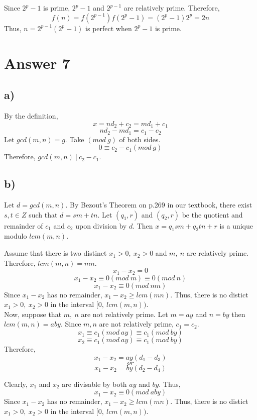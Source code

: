 \documentclass[12pt]{article}
\begin{document}
Since $2^p-1$ is prime, $2^p-1$ and $2^{p-1}$ are relatively prime. Therefore,
$$f(n)=f(2^{p-1})f(2^p-1)=(2^p-1)2^p=2n$$
Thus, $n=2^{p-1}(2^p-1)$ is perfect when $2^p-1$ is prime.

\section*{Answer 7}
\subsection*{a)}
By the definition,
$$x=nd_2+c_2=md_1+c_1$$
$$nd_2-md_1=c_1-c_2$$
Let $gcd(m,n)=g$. Take $(mod\ g)$ of both sides.
$$0 \equiv c_2-c_1(mod\ g)$$
Therefore, $gcd(m,n)\ |\ c_2-c_1$.
\subsection*{b)}
Let $d=gcd(m,n)$. By Bezout's Theorem on p.269 in our textbook, there exist $s,t\in Z$ such that $d=sm+tn$. Let $(q_1,r)$ and $(q_2,r)$ be the quotient and remainder of $c_1$ and $c_2$ upon division by $d$. Then $x=q_1sm+q_2tn+r$ is a unique modulo $lcm(m,n)$.

Assume that there is two distinct $x_1>0,\ x_2>0$ and $m,\ n$ are relatively prime. Therefore, $lcm(m,n)=mn$.
$$x_1-x_2=0$$
$$x_1-x_2\equiv 0(mod\ m)\equiv 0(mod\ n)$$
$$x_1-x_2\equiv 0(mod\ mn)$$
Since $x_1-x_2$ has no remainder, $x_1-x_2\geq lcm(mn)$. Thus, there is no distict $x_1>0,\ x_2>0$ in the interval $[0,\ lcm(m,n))$.\\
Now, suppose that $m,\ n$ are not relatively prime. Let $m=ay$ and $n=by$ then $lcm(m,n)=aby$. Since $m,n$ are not relatively prime, $c_1=c_2$.
$$x_1 \equiv c_1 (mod\ ay)\equiv c_1(mod\ by)$$
$$x_2 \equiv c_1 (mod\ ay)\equiv c_1(mod\ by)$$
Therefore,
$$x_1-x_2= ay(d_1-d_3)$$
$$or$$
$$x_1-x_2= by(d_2-d_4)$$

Clearly, $x_1$ and $x_2$ are divisable by both $ay$ and $by$. Thus, 
$$x_1-x_2\equiv 0 (mod\ aby)$$
Since $x_1-x_2$ has no remainder, $x_1-x_2\geq lcm(mn)$. Thus, there is no distict $x_1>0,\ x_2>0$ in the interval $[0,\ lcm(m,n))$.\\
\end{document}
